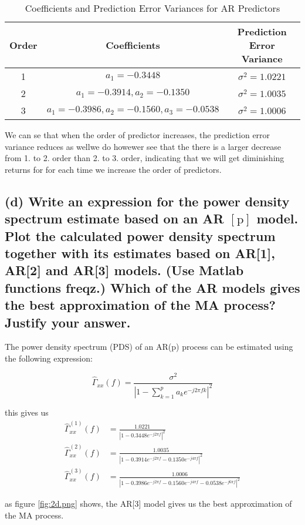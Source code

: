 \begin{table}[H]
    \centering
    \begin{tabular}{c c c}
    \hline
    Order & Coefficients & Prediction Error Variance \\
    \hline
    1 & $a_1 = -0.3448$ & $\sigma^2 = 1.0221$ \\
    2 & $a_1 = -0.3914, a_2 = -0.1350$ & $\sigma^2 = 1.0035$ \\
    3 & $a_1 = -0.3986, a_2 = -0.1560, a_3 = -0.0538$ & $\sigma^2 = 1.0006$ \\
    \hline
    \end{tabular}
    \caption{Coefficients and Prediction Error Variances for AR Predictors}
    \label{table:ar_predictors}
    \end{table}

We can se that when the order of predictor increases, the prediction error variance reduces as wellwe do howewer see that the there is a larger decrease from 1. to 2. order than 2. to 3. order, indicating that we will get diminishing returns for for each time we increase the order of predictors.
\pagebreak
\subsection*{(d) Write an expression for the power density spectrum estimate based on an AR $[\mathrm{p}]$ model.
Plot the calculated power density spectrum together with its estimates based on AR[1], AR[2] and AR[3] models. (Use Matlab functions freqz.)
Which of the AR models gives the best approximation of the MA process? Justify your answer.}
The power density spectrum (PDS) of an AR(p) process can be estimated using the following expression:

$$
\hat{\Gamma}_{x x}(f)=\frac{\sigma^2}{\left|1-\sum_{k=1}^p a_k e^{-j 2 \pi f k}\right|^2}
$$

this gives us 
$$
\begin{aligned}
    \hat{\Gamma}_{x x}^(1)(f)&=\frac{1.0221}{\left|1 -0.3448e^{-j 2 \pi f}\right|^2}\\
    \hat{\Gamma}_{x x}^(2)(f)&=\frac{1.0035}{\left|1 -0.3914e^{-j 2 \pi f}-0.1350e^{-j 4 \pi f}\right|^2}\\
    \hat{\Gamma}_{x x}^(3)(f)&=\frac{1.0006}{\left|1 -0.3986e^{-j 2 \pi f}-0.1560e^{-j 4 \pi f}-0.0538e^{-j 6 \pi f}\right|^2}
\end{aligned}
$$

as figure \ref*{fig:2d.png} shows, the AR[3] model gives us the best approximation of the MA process.
